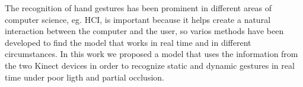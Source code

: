 The recognition of hand gestures has been prominent in different areas of computer science, eg. HCI, is important because it helps create a natural interaction between the computer and the user, so varios methods have been developed to find the model that works in real time and in different circumstances. In this work we proposed a model that uses the information from the two Kinect devices in order to recognize static and dynamic gestures in real time under poor ligth and partial occlusion.    